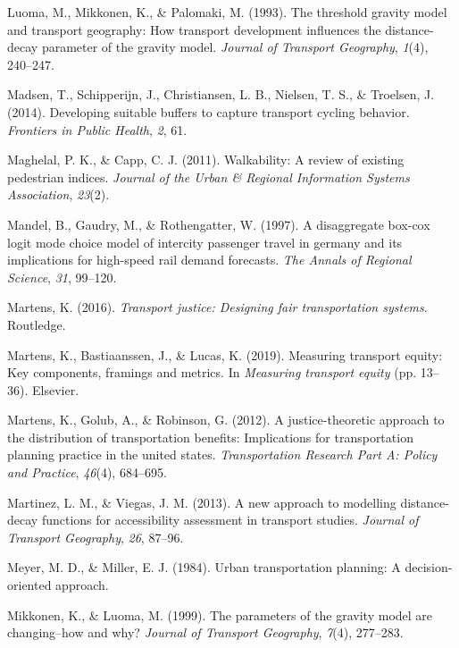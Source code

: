 \documentclass[
11pt, %
oneside, %
english, %
singlespacing, %
]{macthesis} %
\newlength{\cslhangindent}
\newenvironment{CSLReferences}[2] %
{\begin{list}{}{%
	\setlength{\itemindent}{0pt}
	\setlength{\leftmargin}{0pt}
	\setlength{\parsep}{0pt}
	\ifodd #1
	\setlength{\leftmargin}{\cslhangindent}
	\setlength{\itemindent}{-1\cslhangindent}
	\fi
	\setlength{\itemsep}{#2\baselineskip}}}
{\end{list}}
\begin{document}
\begin{CSLReferences}{1}{0}
Luoma, M., Mikkonen, K., \& Palomaki, M. (1993). The threshold gravity model and transport geography: How transport development influences the distance-decay parameter of the gravity model. \emph{Journal of Transport Geography}, \emph{1}(4), 240--247.

Madsen, T., Schipperijn, J., Christiansen, L. B., Nielsen, T. S., \& Troelsen, J. (2014). Developing suitable buffers to capture transport cycling behavior. \emph{Frontiers in Public Health}, \emph{2}, 61.

Maghelal, P. K., \& Capp, C. J. (2011). Walkability: A review of existing pedestrian indices. \emph{Journal of the Urban \& Regional Information Systems Association}, \emph{23}(2).

Mandel, B., Gaudry, M., \& Rothengatter, W. (1997). A disaggregate box-cox logit mode choice model of intercity passenger travel in germany and its implications for high-speed rail demand forecasts. \emph{The Annals of Regional Science}, \emph{31}, 99--120.

Martens, K. (2016). \emph{Transport justice: Designing fair transportation systems}. Routledge.

Martens, K., Bastiaanssen, J., \& Lucas, K. (2019). Measuring transport equity: Key components, framings and metrics. In \emph{Measuring transport equity} (pp. 13--36). Elsevier.

Martens, K., Golub, A., \& Robinson, G. (2012). A justice-theoretic approach to the distribution of transportation benefits: Implications for transportation planning practice in the united states. \emph{Transportation Research Part A: Policy and Practice}, \emph{46}(4), 684--695.

Martinez, L. M., \& Viegas, J. M. (2013). A new approach to modelling distance-decay functions for accessibility assessment in transport studies. \emph{Journal of Transport Geography}, \emph{26}, 87--96.

Meyer, M. D., \& Miller, E. J. (1984). Urban transportation planning: A decision-oriented approach.

Mikkonen, K., \& Luoma, M. (1999). The parameters of the gravity model are changing--how and why? \emph{Journal of Transport Geography}, \emph{7}(4), 277--283.


\end{CSLReferences}
\end{document}
